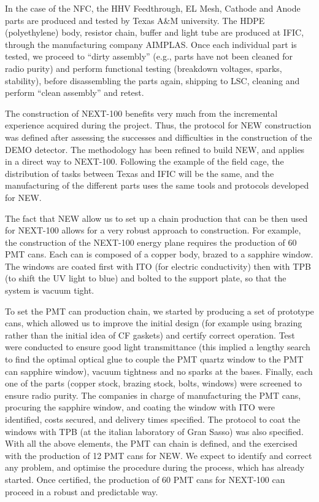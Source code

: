 In the case of the NFC, the HHV Feedthrough, EL Mesh, Cathode and Anode parts are produced and tested by Texas A\&M university. The HDPE (polyethylene) body, resistor chain, buffer and light tube are produced at IFIC, through the manufacturing company AIMPLAS. Once each individual part is tested, we proceed to ``dirty assembly'' (e.g., parts have not been cleaned for radio purity) and perform functional testing (breakdown voltages, sparks, stability), before disassembling the parts again, shipping to LSC, cleaning and perform ``clean assembly'' and retest. 

The construction of NEXT-100 benefits very much from the incremental experience acquired during the project. Thus, the protocol for NEW construction was defined after assessing the successes and difficulties in the construction of the DEMO detector. The methodology has been refined to build NEW, and applies in a direct way to NEXT-100. Following the example of the field cage, the distribution of tasks between Texas and IFIC will be the same, and the manufacturing of the different parts uses the same tools and protocols developed for NEW. 

The fact that NEW allow us to set up a chain production that can be then used for NEXT-100 allows for a very robust approach to construction. For example, the construction of the NEXT-100 energy plane requires the production of 60 PMT cans. Each can is composed of a copper body, brazed to a sapphire window. The windows are coated first with ITO (for electric conductivity) then with TPB (to shift the UV light to blue) and bolted to the support plate, so that the system is vacuum tight. 

To set the PMT can production chain, we started by producing a set of prototype cans, which allowed us to improve the initial design (for example using brazing rather than the initial idea of CF gaskets) and certify correct operation. Test were conducted to ensure good light transmittance (this implied a lengthy search to find the optimal optical glue to couple the PMT quartz window to the PMT can sapphire window), vacuum tightness and no sparks at the bases. Finally, each one of the parts (copper stock, brazing stock, bolts, windows) were screened to ensure radio purity. The companies in charge of manufacturing the PMT cans, procuring the sapphire window, and coating the window with ITO were identified, costs secured, and delivery times specified. The protocol to coat the windows with TPB (at the italian laboratory of Gran Sasso) was also specified. With all the above elements, the PMT can chain is defined, and the exercised with the production of 12 PMT cans for NEW. We expect to identify and correct any problem, and optimise the procedure during the process, which has already started. Once certified, the production of 60 PMT cans for NEXT-100 can proceed in a robust and predictable way. 

